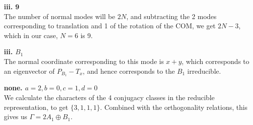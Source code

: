 \begin{alphaparts}

    \questionpart \textbf{iii. 9}\\
    The number of normal modes will be $2N$, and subtracting the 2 modes
    corresponding to translation and 1 of the rotation of the COM, we get $2N -
    3$, which in our case, $N = 6$ is 9.

    \questionpart \textbf{iii. $B_1$}\\
    The normal coordinate corresponding to this mode is $x + y$, which
    corresponds to an eigenvector of $P_{B_1} - T_x$, and hence corresponds to
    the $B_1$ irreducible. 

    \questionpart \textbf{none. $a = 2, b = 0, c = 1, d = 0$}\\
    We calculate the characters of the 4 conjugacy classes in the reducible
    representation, to get $\{3, 1, 1, 1\}$. Combined with the orthogonality
    relations, this gives us $\Gamma = 2A_1 \oplus B_1$.

\end{alphaparts}